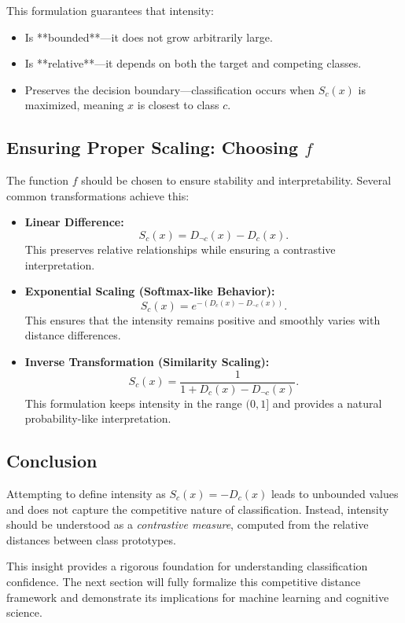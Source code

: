 This formulation guarantees that intensity:

\begin{itemize}
    \item Is **bounded**—it does not grow arbitrarily large.
    \item Is **relative**—it depends on both the target and competing classes.
    \item Preserves the decision boundary—classification occurs when \( S_c(x) \) is maximized, meaning \( x \) is closest to class \( c \).
\end{itemize}

\subsection{Ensuring Proper Scaling: Choosing \( f \)}

The function \( f \) should be chosen to ensure stability and interpretability. Several common transformations achieve this:

\begin{itemize}
    \item \textbf{Linear Difference:}  
    \[
    S_c(x) = D_{\neg c}(x) - D_c(x).
    \]
    This preserves relative relationships while ensuring a contrastive interpretation.
    
    \item \textbf{Exponential Scaling (Softmax-like Behavior):}  
    \[
    S_c(x) = e^{-(D_c(x) - D_{\neg c}(x))}.
    \]
    This ensures that the intensity remains positive and smoothly varies with distance differences.
    
    \item \textbf{Inverse Transformation (Similarity Scaling):}  
    \[
    S_c(x) = \frac{1}{1 + D_c(x) - D_{\neg c}(x)}.
    \]
    This formulation keeps intensity in the range \( (0,1] \) and provides a natural probability-like interpretation.
\end{itemize}

\subsection{Conclusion}

Attempting to define intensity as \( S_c(x) = -D_c(x) \) leads to unbounded values and does not capture the competitive nature of classification. Instead, intensity should be understood as a \textit{contrastive measure}, computed from the relative distances between class prototypes.

This insight provides a rigorous foundation for understanding classification confidence. The next section will fully formalize this competitive distance framework and demonstrate its implications for machine learning and cognitive science.
